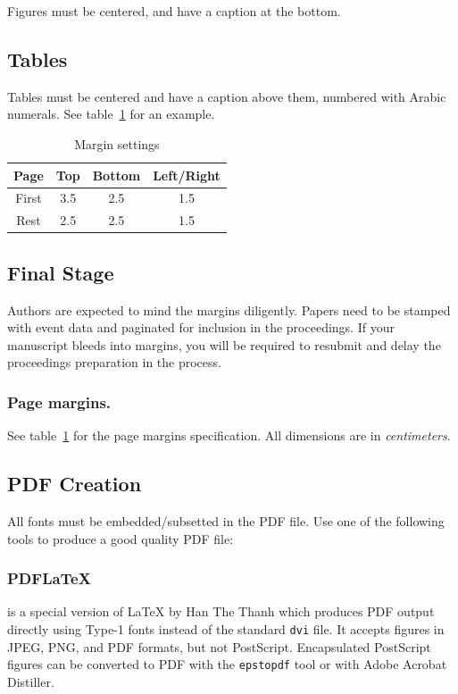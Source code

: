 \documentclass{ifacconf}
\begin{document}
Figures must be centered, and have a caption at the bottom. 

\subsection{Tables}
Tables must be centered and have a caption above them, numbered with
Arabic numerals. See table~\ref{tb:margins} for an example.

\begin{table}[hb]
\begin{center}
\caption{Margin settings}\label{tb:margins}
\begin{tabular}{cccc}
Page & Top & Bottom & Left/Right \\\hline
First & 3.5 & 2.5 & 1.5 \\
Rest & 2.5 & 2.5 & 1.5 \\ \hline
\end{tabular}
\end{center}
\end{table}

\subsection{Final Stage}

Authors are expected to mind the margins diligently.  Papers need to
be stamped with event data and paginated for inclusion in the
proceedings. If your manuscript bleeds into margins, you will be
required to resubmit and delay the proceedings preparation in the
process.

\subsubsection{Page margins.} See table~\ref{tb:margins} for the
page margins specification. All dimensions are in \emph{centimeters}.


\subsection{PDF Creation}

All fonts must be embedded/subsetted in the PDF file. Use one of the
following tools to produce a good quality PDF file:

\subsubsection{PDFLaTeX} is a special version of LaTeX by Han The
Thanh which produces PDF output directly using Type-1 fonts instead of
the standard \texttt{dvi} file. It accepts figures in JPEG, PNG, and PDF
formats, but not PostScript. Encapsulated PostScript figures can be
converted to PDF with the \texttt{epstopdf} tool or with Adobe Acrobat
Distiller.
\end{document}
